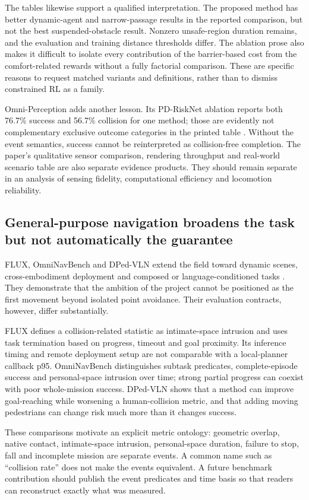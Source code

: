 The tables likewise support a qualified interpretation. The proposed method has
better dynamic-agent and narrow-passage results in the reported comparison, but
not the best suspended-obstacle result. Nonzero unsafe-region duration remains,
and the evaluation and training distance thresholds differ. The ablation prose
also makes it difficult to isolate every contribution of the barrier-based cost
from the comfort-related rewards without a fully factorial comparison. These
are specific reasons to request matched variants and definitions, rather than
to dismiss constrained RL as a family.

Omni-Perception adds another lesson. Its PD-RiskNet ablation reports both
76.7\% success and 56.7\% collision for one method; those are evidently not
complementary exclusive outcome categories in the printed table
\citep{omni}. Without the event semantics, success cannot be reinterpreted as
collision-free completion. The paper's qualitative sensor comparison, rendering
throughput and real-world scenario table are also separate evidence products.
They should remain separate in an analysis of sensing fidelity, computational
efficiency and locomotion reliability.

\subsection{General-purpose navigation broadens the task but not automatically the guarantee}
FLUX, OmniNavBench and DPed-VLN extend the field toward dynamic scenes,
cross-embodiment deployment and composed or language-conditioned tasks
\citep{flux,omninav,dped}. They demonstrate that the ambition of the project
cannot be positioned as the first movement beyond isolated point avoidance.
Their evaluation contracts, however, differ substantially.

FLUX defines a collision-related statistic as intimate-space intrusion and uses
task termination based on progress, timeout and goal proximity. Its inference
timing and remote deployment setup are not comparable with a local-planner
callback p95. OmniNavBench distinguishes subtask predicates, complete-episode
success and personal-space intrusion over time; strong partial progress can
coexist with poor whole-mission success. DPed-VLN shows that a method can improve
goal-reaching while worsening a human-collision metric, and that adding moving
pedestrians can change risk much more than it changes success.

These comparisons motivate an explicit metric ontology: geometric overlap,
native contact, intimate-space intrusion, personal-space duration, failure to
stop, fall and incomplete mission are separate events. A common name such as
``collision rate'' does not make the events equivalent. A future benchmark
contribution should publish the event predicates and time basis so that readers
can reconstruct exactly what was measured.

